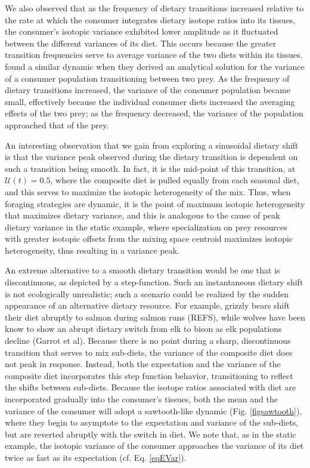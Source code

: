 \documentclass{frontiersSCNS}
\begin{document}
We also observed that as the frequency of dietary transitions increased relative to the rate at which the consumer integrates dietary isotope ratios into its tissues, the consumer's isotopic variance exhibited lower amplitude as it fluctuated between the different variances of its diet.
This occurs because the greater transition frequencies serve to average variance of the two diets within its tissues.
\citet{Fink:2012eg} found a similar dynamic when they derived an analytical solution for the variance of a consumer population transitioning between two prey.
As the frequency of dietary transitions increased, the variance of the consumer population became small, effectively because the individual consumer diets increased the averaging effects of the two prey; as the frequency decreased, the variance of the population approached that of the prey.


An interesting observation that we gain from exploring a sinusoidal dietary shift is that the variance peak observed during the dietary transition is dependent on such a transition being smooth.
In fact, it is the mid-point of this transition, at $\mathcal{U}(t) = 0.5$, where the composite diet is pulled equally from each seasonal diet, and this serves to maximize the isotopic heterogeneity of the mix.
Thus, when foraging strategies are dynamic, it is the point of maximum isotopic heterogeneity that maximizes dietary variance, and this is analogous to the cause of peak dietary variance in the static example, where specialization on prey resources with greater isotopic offsets from the mixing space centroid maximizes isotopic heterogeneity, thus resulting in a variance peak. 

An extreme alternative to a smooth dietary transition would be one that is discontinuous, as depicted by a step-function.
Such an instantaneous dietary shift is not ecologically unrealistic; such a scenario could be realized by the sudden appearance of an alternative dietary resource.
For example, grizzly bears shift their diet abruptly to salmon during salmon runs (REFS), while wolves have been know to show an abrupt dietary switch from elk to bison as elk populations decline (Garrot et al).
Because there is no point during a sharp, discontinuous transition that serves to mix sub-diets, the variance of the composite diet does not peak in response.
Instead, both the expectation and the variance of the composite diet incorporates this step function behavior, transitioning to reflect the shifts between sub-diets.
Because the isotope ratios associated with diet are incorporated gradually into the consumer's tissues, both the mean and the variance of the consumer will adopt a sawtooth-like dynamic (Fig. \ref{figsawtooth}), where they begin to asymptote to the expectation and variance of the sub-diets, but are reverted abruptly with the switch in diet.
We note that, as in the static example, the isotopic variance of the consumer approaches the variance of its diet twice as fast as its expectation (cf. Eq. \ref{eqEVar}).
\end{document}
